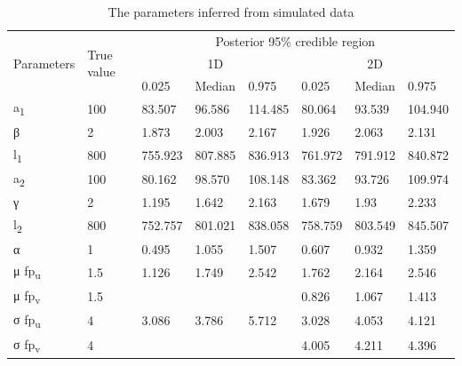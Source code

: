 





\begin{table}[tb]
\centerfloat
\caption{The parameters inferred from simulated data}
\label{tab:inf_params_sim}
\begin{tabular}{ll|lll|lll}
\multirow{3}{*}{Parameters} & \multirow{3}{*}{True value} & \multicolumn{6}{c}{Posterior 95\% credible region} \\ \cline{3-8}
&  & \multicolumn{3}{c|}{1D} & \multicolumn{3}{c}{2D} \\ \cline{3-8} %
&  & 0.025 & Median & 0.975 & 0.025 & Median & 0.975 \\ \hline
a\textsubscript{1} & 100 & 83.507 & 96.586 & \multicolumn{1}{l|}{114.485} & 80.064 & 93.539 & 104.940 \\
β & 2 & 1.873 & 2.003 & \multicolumn{1}{l|}{2.167} & 1.926 & 2.063 & 2.131 \\
l\textsubscript{1} & 800 & 755.923 & 807.885 & \multicolumn{1}{l|}{836.913} & 761.972 & 791.912 & 840.872 \\
a\textsubscript{2} & 100 & 80.162 & 98.570 & \multicolumn{1}{l|}{108.148} & 83.362 & 93.726 & 109.974 \\
γ & 2 & 1.195 & 1.642 & \multicolumn{1}{l|}{2.163} & 1.679 & 1.93 & 2.233 \\
l\textsubscript{2} & 800 & 752.757 & 801.021 & \multicolumn{1}{l|}{838.058} & 758.759 & 803.549 & 845.507 \\
α & 1 & 0.495 & 1.055 & \multicolumn{1}{l|}{1.507} & 0.607 & 0.932 & 1.359 \\
μ fp\textsubscript{u} & 1.5 & 1.126 & 1.749 & \multicolumn{1}{l|}{2.542} & 1.762 & 2.164 & 2.546 \\
μ fp\textsubscript{v} & 1.5 &  &  & \multicolumn{1}{l|}{} & 0.826 & 1.067 & 1.413 \\
σ fp\textsubscript{u} & 4 & 3.086 & 3.786 & \multicolumn{1}{l|}{5.712} & 3.028 & 4.053 & 4.121 \\
σ fp\textsubscript{v} & 4 &  &  & \multicolumn{1}{l|}{} & 4.005 & 4.211 & 4.396 \\ \bottomrule
\end{tabular}
\end{table}
